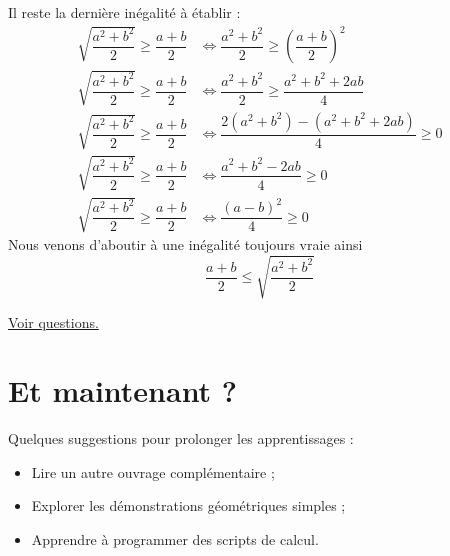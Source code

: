 \documentclass[11pt]{article}
\begin{document}
\begin{enumerate}
Il reste la dernière inégalité à établir : 
\begin{align*}
	\sqrt{\dfrac{a^2+b^2}{2}} \geq \dfrac{a+b}{2} &\iff \dfrac{a^2+b^2}{2} \geq \left(\dfrac{a+b}{2}\right)^2 \\
	\sqrt{\dfrac{a^2+b^2}{2}} \geq \dfrac{a+b}{2} &\iff \dfrac{a^2+b^2}{2} \geq \dfrac{a^2+b^2 + 2ab}{4} \\
	\sqrt{\dfrac{a^2+b^2}{2}} \geq \dfrac{a+b}{2} &\iff \dfrac{2(a^2+b^2) - (a^2+b^2 + 2ab)}{4} \geq 0 \\
	\sqrt{\dfrac{a^2+b^2}{2}} \geq \dfrac{a+b}{2} &\iff \dfrac{a^2 + b^2 - 2ab}{4} \geq 0 \\
	\sqrt{\dfrac{a^2+b^2}{2}} \geq \dfrac{a+b}{2} &\iff \dfrac{(a - b)^2}{4} \geq 0 
\end{align*}
Nous venons d'aboutir à une inégalité toujours vraie ainsi 
\[\boxed{\dfrac{a + b}{2}\leq \sqrt{\dfrac{a^2+b^2}{2}}}\]
\end{enumerate}




\hyperref[org7d8c58b]{Voir questions.}

\newpage


\section{Et maintenant ?}
\label{sec:org02244a0}
Quelques suggestions pour prolonger les apprentissages :

\begin{itemize}
\item Lire un autre ouvrage complémentaire ;
\item Explorer les démonstrations géométriques simples ;
\item Apprendre à programmer des scripts de calcul.
\end{itemize}
\end{document}
